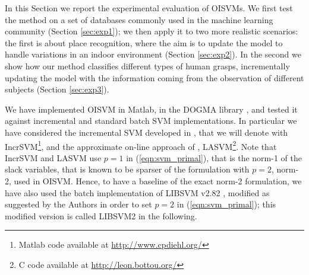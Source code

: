 In this Section we report the experimental evaluation of OISVMs. We
first test the method on a set of databases commonly used in the
machine learning community (Section \ref{sec:exp1}); we then apply it
to two more realistic scenarios: the first is about place recognition,
where the aim is to update the model to handle variations in an indoor
environment (Section \ref{sec:exp2}). In the second we show how our
method classifies different types of human grasps, incrementally
updating the model with the information coming from the observation of
different subjects (Section \ref{sec:exp3}).

We have implemented OISVM in Matlab, in the DOGMA library \cite{Orabona09}, and tested it against incremental
and standard batch SVM implementations. In particular we have considered
the incremental SVM developed in \cite{CauwenberghsP00,DiehlC03}, that we will
denote with IncrSVM\footnote{Matlab code available at \url{http://www.cpdiehl.org/}},
and the approximate on-line approach of
\cite{BordesEWB05}, LASVM\footnote{C code available at \url{http://leon.bottou.org/}}.
Note that IncrSVM and LASVM use $p=1$ in (\ref{eqn:svm_primal}),
that is the norm-1 of the slack variables,
that is known to be sparser of the formulation with $p=2$, norm-2, used in OISVM.
Hence, to have a baseline of the exact norm-2 formulation, we have also used the
batch implementation of LIBSVM v2.82 \cite{ChangL01},
modified as suggested by the Authors in order to set $p=2$ in
(\ref{eqn:svm_primal}); this modified version is called LIBSVM2 in
the following.

